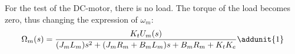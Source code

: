 For the test of the DC-motor, there is no load. The torque of the load becomes zero, thus changing the expression of $\omega_m$: 
\begin{equation}
	\Omega_m(s) = \frac{K_tU_m(s)}{(J_mL_m)s^2 + (J_mR_m + B_mL_m)s + B_mR_m + K_tK_e} \addunit{1}
\end{equation}









